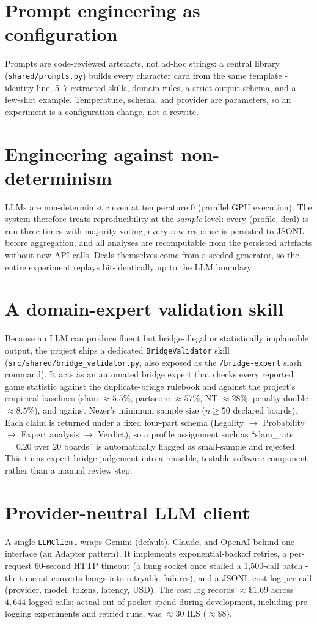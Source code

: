 \documentclass[11pt, a4paper, oneside, openany]{report}
\begin{document}
\section{Prompt engineering as configuration}
Prompts are code-reviewed artefacts, not ad-hoc strings: a central library
(\texttt{shared/prompts.py}) builds every character card from the same
template - identity line, 5--7 extracted skills, domain rules, a strict
output schema, and a few-shot example. Temperature, schema, and provider are
parameters, so an experiment is a configuration change, not a rewrite.

\section{Engineering against non-determinism}
LLMs are non-deterministic even at temperature $0$ (parallel GPU execution).
The system therefore treats reproducibility at the \emph{sample} level:
every (profile, deal) is run three times with majority voting; every raw
response is persisted to JSONL before aggregation; and all analyses are
recomputable from the persisted artefacts without new API calls. Deals
themselves come from a seeded generator, so the entire experiment replays
bit-identically up to the LLM boundary.

\section{A domain-expert validation skill}
Because an LLM can produce fluent but bridge-illegal or statistically
implausible output, the project ships a dedicated
\texttt{BridgeValidator} skill (\texttt{src/shared/bridge\_validator.py},
also exposed as the \texttt{/bridge-expert} slash command). It acts as an
automated bridge expert that checks every reported game statistic against
the duplicate-bridge rulebook and against the project's empirical baselines
(slam ${\approx}5.5\%$, partscore ${\approx}57\%$, NT ${\approx}28\%$,
penalty double ${\approx}8.5\%$), and against Nezer's minimum sample size
($n \geq 50$ declared boards). Each claim is returned under a fixed
four-part schema (Legality $\rightarrow$ Probability $\rightarrow$ Expert
analysis $\rightarrow$ Verdict), so a profile assignment such as
``slam\_rate $=0.20$ over $20$ boards'' is automatically flagged as
small-sample and rejected. This turns expert bridge judgement into a
reusable, testable software component rather than a manual review step.

\section{Provider-neutral LLM client}
A single \texttt{LLMClient} wraps Gemini (default), Claude, and OpenAI behind
one interface (an Adapter pattern). It implements exponential-backoff
retries, a per-request 60-second HTTP timeout (a hung socket once stalled a
1{,}500-call batch - the timeout converts hangs into retryable failures),
and a JSONL cost log per call (provider, model, tokens, latency, USD).
The cost log records ${\approx}\$1.69$ across $4{,}644$ logged calls; actual
out-of-pocket spend during development, including pre-logging experiments and
retried runs, was ${\approx}30$ ILS (${\approx}\$8$).
\end{document}

